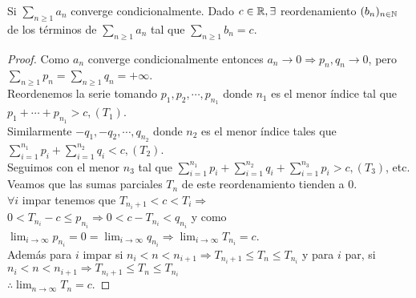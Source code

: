 \begin{theorem}
  Si \(\sum_{n \geq 1} a_n\) converge condicionalmente. Dado \(c \in \mathbb{R}, \exists\) reordenamiento \((b_n)_{n \in \mathbb{N}}\) de los términos de \(\sum_{n \geq 1} a_n\) tal que \(\sum_{n \geq 1} b_n = c\).
  \begin{proof}
    Como \(a_n\) converge condicionalmente entonces \(a_n \to 0 \Rightarrow p_n, q_n \to 0\), pero \(\sum_{n \geq 1} p_n = \sum_{n \geq 1} q_n = +\infty\). \\
    Reordenemos la serie tomando \(p_1, p_2, \cdots, p_{n_1}\) donde \(n_1\) es el menor índice tal que \(p_1 + \cdots + p_{n_1} > c, (T_1)\). \\
    Similarmente \(-q_1, -q_2, \cdots, q_{n_2}\) donde \(n_2\) es el menor índice tales que \(\sum_{i = 1}^{n_1} p_i + \sum_{i = 1}^{n_2} q_i < c, (T_2)\). \\
    Seguimos con el menor \(n_3\) tal que \(\sum_{i = 1}^{n_1} p_i + \sum_{i = 1}^{n_2} q_i + \sum_{i = 1}^{n_3} p_i > c, (T_3)\), etc. \\
    Veamos que las sumas parciales \(T_n\) de este reordenamiento tienden a 0. \\
    \(\forall i\) impar tenemos que \(T_{n_i +1} < c < T_i \Rightarrow\) \\
    \(0 < T_{n_i} - c \leq p_{n_i} \Rightarrow 0 < c - T_{n_i} < q_{n_i}\) y como \(\lim_{i \to \infty} p_{n_i} = 0 = \lim_{i \to \infty} q_{n_i} \Rightarrow \lim_{i \to \infty} T_{n_i} = c\). \\
    Además para \(i\) impar si \(n_i < n < n_{i+1} \Rightarrow T_{n_i+1} \leq T_n \leq T_{n_i}\) y para \(i\) par, si \(n_i < n < n_{i+1} \Rightarrow T_{n_i+1} \leq T_n \leq T_{n_i}\) \\
    \(\therefore \lim_{n \to \infty} T_n = c\).
  \end{proof}
\end{theorem}
